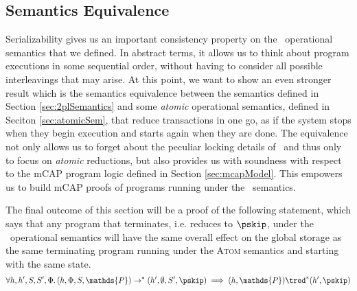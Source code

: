 \subsection{Semantics Equivalence}

Serializability gives us an important consistency property on the \tpl\ operational semantics that we defined. In abstract terms, it allows us to think about program executions in some sequential order, without having to consider all possible interleavings that may arise. At this point, we want to show an even stronger result which is the semantics equivalence between the semantics defined in Section \ref{sec:2plSemantics} and some \textit{atomic} operational semantics, defined in Seciton \ref{sec:atomicSem}, that reduce transactions in one go, as if the system stops when they begin execution and starts again when they are done. The equivalence not only allows us to forget about the peculiar locking details of \tpl\ and thus only to focus on \textit{atomic} reductions, but also provides us with soundness with respect to the mCAP program logic defined in Section \ref{sec:mcapModel}. This empowers us to build mCAP proofs of programs running under the \tpl\ semantics.

The final outcome of this section will be a proof of the following statement, which says that any program that terminates, i.e. reduces to $\pskip$, under the \tpl\ operational semantics will have the same overall effect on the global storage as the same terminating program running under the \textsc{Atom} semantics and starting with the same state.
\[
	\forall h, h', S, S', \Phi \ldotp
	(h, \Phi, S, \mathds{P}) \rightarrow^* (h', \emptyset, S', \pskip) \implies 
	(h, \mathds{P}) \tred^* (h', \pskip)
\]



%

%

%

